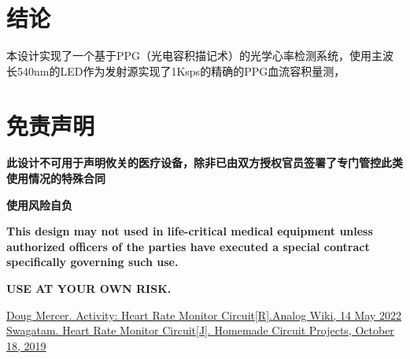 \documentclass[a4paper]{ctexart}
\begin{document}
\newpage
\section{结论}

	本设计实现了一个基于PPG（光电容积描记术）的光学心率检测系统，使用主波长540nm的LED作为发射源实现了1Ksps的精确的PPG血流容积量测，

\section{免责声明}
	\textbf{此设计不可用于声明攸关的医疗设备，除非已由双方授权官员签署了专门管控此类使用情况的特殊合同}
	
	\textbf{使用风险自负}
	
	\textbf{This design may not used in life-critical medical equipment unless authorized officers of the parties have executed a special contract specifically governing such use.}
	
	\textbf{USE AT YOUR OWN RISK.}

\newpage
\begin{thebibliography}{20}
	\href{https://wiki.analog.com/university/courses/alm1k/alm-lab-heart-rate-mon}{Doug Mercer. Activity: Heart Rate Monitor Circuit[R].Analog Wiki, 14 May 2022}
	\href{https://www.homemade-circuits.com/heart-rate-monitor-alarm-circuit/}{Swagatam. Heart Rate Monitor Circuit[J]. Homemade Circuit Projects, October 18, 2019}
\end{thebibliography}
\end{document}
